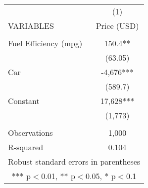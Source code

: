 \begin{tabular}{lc} \hline
 & (1) \\
VARIABLES & Price (USD) \\ \hline
 &  \\
Fuel Efficiency (mpg) & 150.4** \\
 & (63.05) \\
Car & -4,676*** \\
 & (589.7) \\
Constant & 17,628*** \\
 & (1,773) \\
 &  \\
Observations & 1,000 \\
 R-squared & 0.104 \\ \hline
\multicolumn{2}{c}{ Robust standard errors in parentheses} \\
\multicolumn{2}{c}{ *** p$<$0.01, ** p$<$0.05, * p$<$0.1} \\
\end{tabular}
